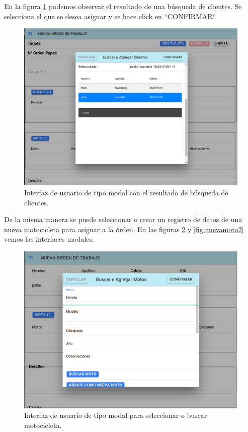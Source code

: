 En la figura \ref{fig:nuevacliente2} podemos observar el resultado de una búsqueda de clientes. Se selecciona el que se desea asignar y se hace click en ``CONFIRMAR``.

\begin{figure}[H]
	\centering
	\includegraphics[scale=.30]{./Figures/nueva-clientes-2.png}
	\caption{Interfaz de usuario de tipo modal con el resultado de búsqueda de clientes.}
	\label{fig:nuevacliente2}
\end{figure}

De la misma manera se puede seleccionar o crear un registro de datos de una nueva motocicleta para asignar a la órden. En las figuras \ref{fig:nuevamoto1} y \ref{fig:nuevamoto2} vemos las interfaces modales.


\begin{figure}[H]
	\centering
	\includegraphics[scale=.30]{./Figures/nueva-moto-1.png}
	\caption{Interfaz de usuario de tipo modal para seleccionar o buscar motocicleta.}
	\label{fig:nuevamoto1}
\end{figure}

